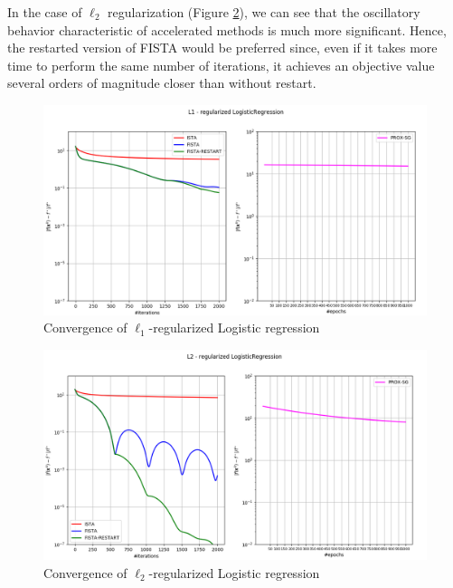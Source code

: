 \documentclass{article}
\begin{document}
In the case of $\ell_2$ regularization (Figure \ref{fig:conv_l2}), we can see that the oscillatory behavior characteristic of accelerated methods is much more significant. Hence, the restarted version of FISTA would be preferred since, even if it takes more time to perform the same number of iterations, it achieves an objective value several orders of magnitude closer than without restart.

\begin{figure}[H]
    \centering
    \includegraphics[trim={0cm 0cm 1cm 0},clip, width=.9\textwidth]{img/convergence_l1.png}
    \caption{Convergence of $\ell_1$-regularized Logistic regression}
    \label{fig:conv_l1}
\end{figure}
\begin{figure}[H]
    \centering
    \includegraphics[trim={0 0cm 1.5cm 0},clip, width=.9\textwidth]{img/convergence_l2.png}
    \caption{Convergence of $\ell_2$-regularized Logistic regression}
    \label{fig:conv_l2}
\end{figure}
\end{document}
